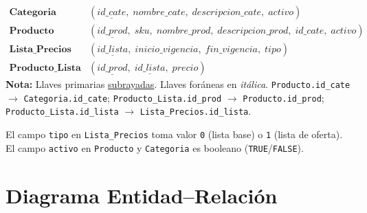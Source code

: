 \documentclass[12pt,a4paper]{article}
\begin{document}
\begin{schemabox}
\begin{align*}
  \textbf{Categoria}&(\underline{id\_cate},\;
    nombre\_cate,\; descripcion\_cate,\; activo)\\[4pt]
  \textbf{Producto}&(\underline{id\_prod},\;
    sku,\; nombre\_prod,\; descripcion\_prod,\;
    \textit{id\_cate},\; activo)\\[4pt]
  \textbf{Lista\_Precios}&(\underline{id\_lista},\;
    inicio\_vigencia,\; fin\_vigencia,\; tipo)\\[4pt]
  \textbf{Producto\_Lista}&(\underline{\textit{id\_prod}},\;
    \underline{\textit{id\_lista}},\; precio)
\end{align*}
\smallskip
\footnotesize
\textbf{Nota:} Llaves primarias \underline{subrayadas}. Llaves foráneas en \textit{itálica}.
\quad\texttt{Producto.id\_cate} $\to$ \texttt{Categoria.id\_cate};\quad
\texttt{Producto\_Lista.id\_prod} $\to$ \texttt{Producto.id\_prod};\quad
\texttt{Producto\_Lista.id\_lista} $\to$ \texttt{Lista\_Precios.id\_lista}.

\vspace{0.3cm}
\normalsize
El campo \texttt{tipo} en \texttt{Lista\_Precios} toma valor \texttt{0} (lista base)
o \texttt{1} (lista de oferta).
El campo \texttt{activo} en \texttt{Producto} y \texttt{Categoria} es booleano
(\texttt{TRUE}/\texttt{FALSE}).
\end{schemabox}

\vspace{0.8cm}

\section*{Diagrama Entidad--Relación}
\end{document}
